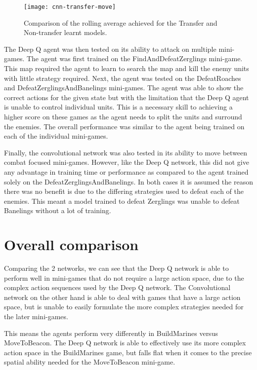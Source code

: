 \begin{figure}[h]
    \centering
    \texttt{[image: cnn-transfer-move]}
    \caption{Comparison of the rolling average achieved for the Transfer and
    Non-transfer learnt models.}%
    \label{fig:transfer_cnn_move}%
\end{figure}

The Deep Q agent was then tested on its ability to attack on multiple mini-games.
The agent was first trained on the FindAndDefeatZerglings mini-game. This map required
the agent to learn to search the map and kill the enemy units with little
strategy required. Next, the agent was tested on the DefeatRoaches and
DefeatZerglingsAndBanelings mini-games. The agent was able to show the correct
actions for the given state but with the limitation that the Deep Q agent is
unable to control individual units. This is a necessary skill to achieving a
higher score on these games as the agent needs to split the units and surround
the enemies. The overall performance was similar to the agent being trained on
each of the individual mini-games.

Finally, the convolutional network was also tested in its ability to move
between combat focused mini-games. However, like the Deep Q network, this did
not give any advantage in training time or performance as compared to the agent
trained solely on the DefeatZerglingsAndBanelings. In both cases it is assumed
the reason there was no benefit is due to the differing strategies used to
defeat each of the enemies. This meant a model trained to defeat Zerglings was
unable to defeat Banelings without a lot of training.

\section{Overall comparison}

Comparing the 2 networks, we can see that the Deep Q network is able to perform
well in mini-games that do not require a large action space, due to the complex
action sequences used by the Deep Q network. The Convolutional network on the
other hand is able to deal with games that have a large action space, but is
unable to easily formulate the more complex strategies needed for the later
mini-games.

This means the agents perform very differently in BuildMarines versus MoveToBeacon.
The Deep Q network is able to effectively use its more complex action space in
the BuildMarines game, but falls flat when it comes to the precise spatial
ability needed for the MoveToBeacon mini-game.

